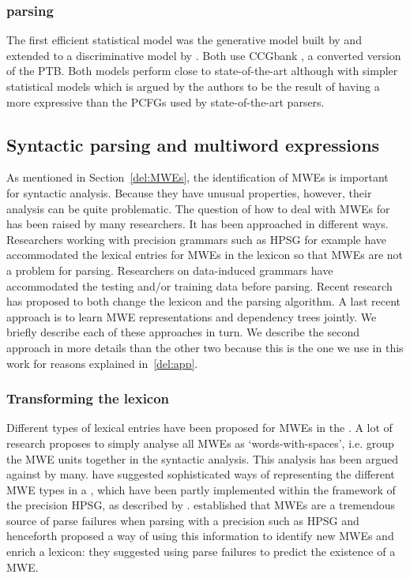 \documentclass[output=paper]{langsci/langscibook}
\begin{document}
                        \subsubsection{ parsing}
                        \indent The first efficient statistical model was the generative model built by \citet{hockenmaier2002} and extended to a discriminative model by \citet{clarkcurran2007}. Both use CCGbank \citep{hockenmaier2007}, a  converted version of the PTB. Both models perform close to state-of-the-art although with simpler statistical models which is argued by the authors to be the result of having a more expressive  than the PCFGs used by state-of-the-art parsers.

                        \subsection{Syntactic parsing and multiword expressions}
                        \label{del:syntacticparsingandMWES}
                        \indent As mentioned in Section~\ref{del:MWEs}, the identification of MWEs is important for syntactic analysis. Because they have unusual properties, however, their analysis can be quite problematic. The question of how to deal with MWEs for  has been raised by many researchers. It has been approached in different ways. Researchers working with precision grammars such as HPSG for example have accommodated the lexical entries for MWEs in the lexicon so that MWEs are not a problem for parsing. Researchers on data-induced grammars have accommodated the testing and/or training data before parsing. Recent research has proposed to both change the lexicon and the parsing algorithm. A last recent approach is to learn MWE representations and dependency trees jointly. We briefly describe each of these approaches in turn. We describe the second approach in more details than the other two because this is the one we use in this work for reasons explained in~\ref{del:app}.

                        \subsubsection{Transforming the lexicon}
                        \indent Different types of lexical entries have been proposed for MWEs in the . A lot of research proposes to simply analyse all MWEs as `words-with-spaces', i.e. group the MWE units together in the syntactic analysis. This analysis has been argued against by many. \citet{sag02} have suggested sophisticated ways of representing the different MWE types in a , which have been partly implemented within the framework of the precision  HPSG, as described by \citet{copestakeetal2002}. \citet{zhangetal2006} established that MWEs are a tremendous source of parse failures when parsing with a precision  such as HPSG and henceforth proposed a way of using this information to identify new MWEs and enrich a lexicon: they suggested using parse failures to predict the existence of a MWE.
\end{document}
